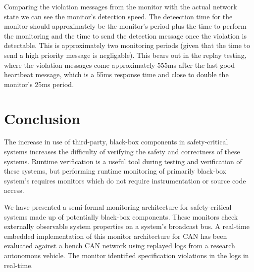 \documentclass[]{llncs}
\begin{document}
Comparing the violation messages from the monitor with the actual network state we can see the monitor's detection speed. 
The deteection time for the monitor should approximately be the monitor's period plus the time to perform the monitoring and the time to send the detection message once the violation is detectable. 
This is approximately two monitoring periods (given that the time to send a high priority message is negligable). This bears out in the replay testing, where the violation messages come approximately 555ms after the last good heartbeat message, which is a 55ms response time and close to double the monitor's 25ms period.



\section{Conclusion}
The increase in use of third-party, black-box components in safety-critical systems increases the difficulty of verifying the safety and correctness of these systems. Runtime verification is a useful tool during testing and verification of these systems, but performing runtime monitoring of primarily black-box system's requires monitors which do not require instrumentation or source code access.

We have presented a semi-formal monitoring architecture for safety-critical systems made up of potentially black-box components. These monitors check externally observable system properties on a system's broadcast bus. A real-time embedded implementation of this monitor architecture for CAN has been evaluated against a bench CAN network using replayed logs from a research autonomous vehicle. The monitor identified specification violations in the logs in real-time.



\end{document}
